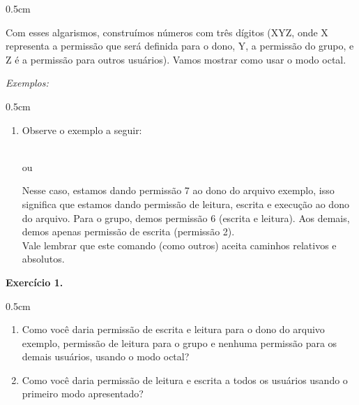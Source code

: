 \begin{refsection}
\begin {myindentpar}{0.5cm}
\begin{enumerate}[\itshape i.]
 Com esses algarismos, construímos números com três dígitos (XYZ, onde X representa a permissão que será definida para o dono, Y, a permissão do grupo, e Z é a permissão para outros usuários). Vamos mostrar como usar o modo octal.\\

\end{enumerate}
\end{myindentpar}

\textit{Exemplos:}
\begin {myindentpar}{0.5cm}
\begin{enumerate}[\itshape i.]

\item{Observe o exemplo a seguir:}

 \\
ou\\

Nesse caso, estamos dando permissão 7 ao dono do arquivo exemplo, isso significa que estamos dando permissão de leitura, escrita e execução ao dono do arquivo. Para o grupo, demos permissão 6 (escrita e leitura). Aos demais, demos apenas permissão de escrita (permissão 2).\\
Vale lembrar que este comando (como outros) aceita caminhos relativos e absolutos.\\
\end{enumerate}
\end{myindentpar}

\begin{blackBlock}{\textbf{Exercício 1.}}\label{tut1:ex:1.\arabic{ex}}

\begin {myindentpar}{0.5cm}
\begin{enumerate}[\itshape i.]
 \item{Como você daria permissão de escrita e leitura para o dono do arquivo exemplo, permissão de leitura para o grupo e nenhuma permissão para os demais usuários, usando o modo octal?}

 \item{Como você daria permissão de leitura e escrita a todos os usuários usando o primeiro modo apresentado?}

\end{enumerate}
\end{myindentpar}

\end{blackBlock}


\end{refsection}
